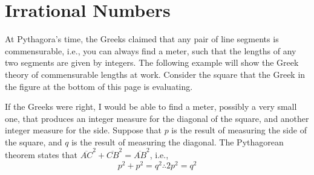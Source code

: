 \documentclass[a4paper,12pt]{book}
\begin{document}
\section{Irrational Numbers}
At Pythagora's time, the Greeks claimed that any
pair of line segments is commensurable, i.e., you
can always find a meter, such that the lengths of
any two segments are given by integers.  The following
example will show  the Greek theory of commensurable
lengths at work. Consider the square that the Greek in
the figure at the bottom of this page is evaluating.


If the Greeks were right, I would be able to find a
meter, possibly a very small one, that produces an
integer measure for the diagonal of the square,
and another integer measure for the side. Suppose
that $p$ is the result of measuring the side of the
square, and $q$ is the result of measuring the diagonal.
The Pythagorean theorem states that
$\overline{AC}^2+\overline{CB}^2= \overline{AB}^2$, i.e.,
\begin{equation}
p^2+p^2= q^2\therefore 2p^2=q^2\label{Pytagoras1}
\end{equation}
\end{document}
